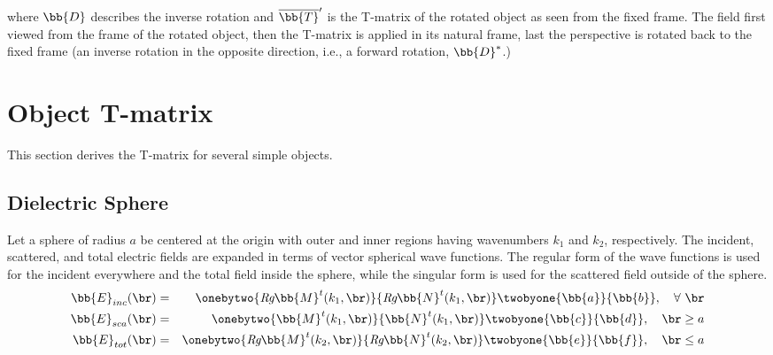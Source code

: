 \noindent where $\bb{D}$ describes the inverse rotation and $\overline{\bb{T}}'$ is the T-matrix of the rotated object as seen from the fixed frame. The field first viewed from the frame of the rotated object, then the T-matrix is applied in its natural frame, last the perspective is rotated back to the fixed frame (an inverse rotation in the opposite direction, i.e., a forward rotation, $\bb{D}^*$.)



%
%
%


\clearpage
\newpage
\section{Object T-matrix}

This section derives the T-matrix for several simple objects.

\subsection{Dielectric Sphere}
\label{sec:tmatrixsphere}
Let a sphere of radius $a$ be centered at the origin with outer and inner regions having wavenumbers $k_1$ and $k_2$, respectively.  The incident, scattered, and total electric fields are expanded in terms of vector spherical wave functions. The regular form of the wave functions is used for the incident everywhere and the total field inside the sphere, while the singular form is used for the scattered field outside of the sphere. 
\begin{eqnarray}
\bb{E}_{inc}(\br) &=& \onebytwo{\textit{Rg}\bb{M}^t(k_1,\br)}{\textit{Rg}\bb{N}^t(k_1,\br)}\twobyone{\bb{a}}{\bb{b}}, \quad \forall \ \br \\
\bb{E}_{sca}(\br) &=& \onebytwo{\bb{M}^t(k_1,\br)}{\bb{N}^t(k_1,\br)}\twobyone{\bb{c}}{\bb{d}}, \quad \br \ge a \\
\bb{E}_{tot}(\br) &=& \onebytwo{\textit{Rg}\bb{M}^t(k_2,\br)}{\textit{Rg}\bb{N}^t(k_2,\br)}\twobyone{\bb{e}}{\bb{f}}, \quad \br \le a
\end{eqnarray}

